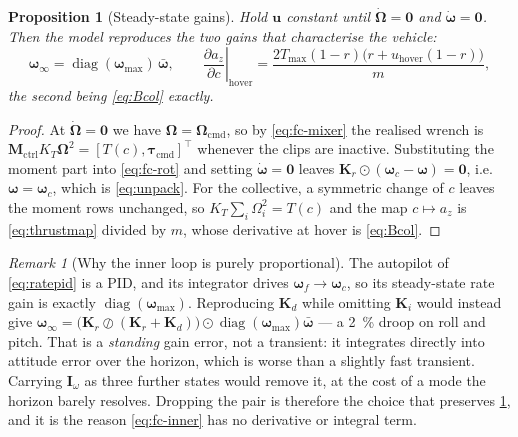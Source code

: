 \documentclass[11pt,a4paper,twoside,openright]{report}
\newcommand{\diag}{\operatorname{diag}}
\newcommand{\transp}{^{\!\top}}
\renewcommand{\vec}[1]{\bm{#1}}
\newcommand{\mat}[1]{\bm{#1}}
\newcommand{\inp}{\vec{u}}
\newcommand{\bodyrate}{\vec{\omega}}
\theoremstyle{plain}
\newtheorem{proposition}[theorem]{Proposition}
\theoremstyle{definition}
\theoremstyle{remark}
\newtheorem{remark}[theorem]{Remark}
\begin{document}
	\begin{proposition}[Steady-state gains]
		\label{prop:dcgain}
		Hold $\inp$ constant until $\dot{\vec\Omega}=\vec 0$ and
		$\dot{\bodyrate}=\vec 0$. Then the model reproduces the two gains that
		characterise the vehicle:
		\begin{equation}
			\bodyrate_\infty=\diag(\bodyrate_{\max})\,\bar{\bodyrate},
			\qquad
			\left.\frac{\partial a_z}{\partial c}\right|_\mathrm{hover}
			=\frac{2T_{\max}(1-r)\big(r+u_\mathrm{hover}(1-r)\big)}{m},
			\label{eq:dcgain}
		\end{equation}
		the second being \cref{eq:Bcol} exactly.
	\end{proposition}

	\begin{proof}
		At $\dot{\vec\Omega}=\vec 0$ we have $\vec\Omega=\vec\Omega_\mathrm{cmd}$, so
		by \cref{eq:fc-mixer} the realised wrench is
		$\mat M_\mathrm{ctrl}K_T\vec\Omega^{2}=[T(c),\vec\tau_\mathrm{cmd}]\transp$
		whenever the clips are inactive. Substituting the moment part into
		\cref{eq:fc-rot} and setting $\dot{\bodyrate}=\vec 0$ leaves
		$\vec K_r\odot(\bodyrate_c-\bodyrate)=\vec 0$, i.e.\ $\bodyrate=\bodyrate_c$,
		which is \cref{eq:unpack}. For the collective, a symmetric change of $c$
		leaves the moment rows unchanged, so $K_T\sum_i\Omega_i^{2}=T(c)$ and the map
		$c\mapsto a_z$ is \cref{eq:thrustmap} divided by $m$, whose derivative at
		hover is \cref{eq:Bcol}.
	\end{proof}

	\begin{remark}[Why the inner loop is purely proportional]
		The autopilot of \cref{eq:ratepid} is a PID, and its integrator drives
		$\bodyrate_f\to\bodyrate_c$, so its steady-state rate gain is exactly
		$\diag(\bodyrate_{\max})$. Reproducing $\vec K_d$ while omitting $\vec K_i$
		would instead give
		$\bodyrate_\infty=\big(\vec K_r\oslash(\vec K_r+\vec K_d)\big)\odot
		\diag(\bodyrate_{\max})\bar{\bodyrate}$ --- a \SI{2}{\percent} droop on roll
		and pitch. That is a \emph{standing} gain error, not a transient: it
		integrates directly into attitude error over the horizon, which is worse than
		a slightly fast transient. Carrying $\vec I_\omega$ as three further states
		would remove it, at the cost of a mode the horizon barely resolves. Dropping
		the pair is therefore the choice that preserves \cref{prop:dcgain}, and it is
		the reason \cref{eq:fc-inner} has no derivative or integral term.
	\end{remark}
\end{document}
